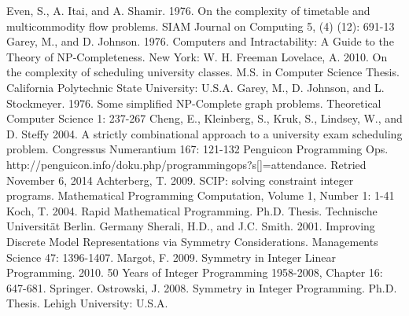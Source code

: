 \documentclass[]{article}
\theoremstyle{definition}
\theoremstyle{remark}
\numberwithin{equation}{section}
\begin{document}
\pagebreak

\begin{thebibliography}{9}
	Even, S., A. Itai, and A. Shamir. 1976. On the complexity of timetable and multicommodity flow problems. SIAM Journal on Computing 5, (4) (12): 691-13
	Garey, M., and D. Johnson. 1976. Computers and Intractability: A Guide to the Theory of NP-Completeness. New York: W. H. Freeman
	Lovelace, A. 2010. On the complexity of scheduling university classes. M.S. in Computer Science Thesis. California Polytechnic State University: U.S.A.	
	Garey, M., D. Johnson, and L. Stockmeyer. 1976. Some simplified NP-Complete graph problems. Theoretical Computer Science 1: 237-267
	Cheng, E., Kleinberg, S., Kruk, S., Lindsey, W., and D. Steffy 2004. A strictly combinational approach to a university exam scheduling problem. Congressus Numerantium 167: 121-132
	Penguicon Programming Ops. http://penguicon.info/doku.php/programmingops?s[]=attendance. Retried November 6, 2014
	Achterberg, T. 2009. SCIP: solving constraint integer programs. Mathematical Programming Computation, Volume 1, Number 1: 1-41
	Koch, T. 2004. Rapid Mathematical Programming. Ph.D. Thesis. Technische Universit{\"a}t Berlin. Germany
	Sherali, H.D., and J.C. Smith. 2001. Improving Discrete Model Representations via Symmetry Considerations. Managements Science 47: 1396-1407.
	Margot, F. 2009. Symmetry in Integer Linear Programming. 2010. 50 Years of Integer Programming 1958-2008, Chapter 16: 647-681. Springer.
	Ostrowski, J. 2008. Symmetry in Integer Programming. Ph.D. Thesis. Lehigh University: U.S.A. 
\end{thebibliography}
\end{document}
